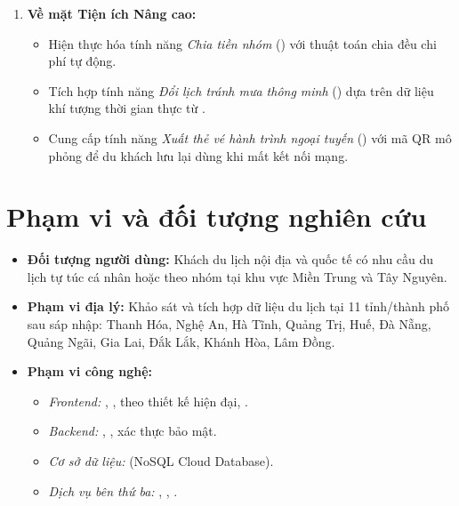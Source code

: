\begin{enumerate}
\begin{itemize}
        \item Phát triển 5 Tab chức năng chính: Khám phá (), Lên lịch (), Chuyến đi (), Trợ lý AI (), và Tài khoản ().
    \end{itemize}
    \item \textbf{Về mặt Tiện ích Nâng cao:}
    \begin{itemize}
        \item Hiện thực hóa tính năng \textit{Chia tiền nhóm} () với thuật toán chia đều chi phí tự động.
        \item Tích hợp tính năng \textit{Đổi lịch tránh mưa thông minh} () dựa trên dữ liệu khí tượng thời gian thực từ .
        \item Cung cấp tính năng \textit{Xuất thẻ vé hành trình ngoại tuyến} () với mã QR mô phỏng để du khách lưu lại dùng khi mất kết nối mạng.
    \end{itemize}
\end{enumerate}

\section{Phạm vi và đối tượng nghiên cứu}

\begin{itemize}
    \item \textbf{Đối tượng người dùng:} Khách du lịch nội địa và quốc tế có nhu cầu du lịch tự túc cá nhân hoặc theo nhóm tại khu vực Miền Trung và Tây Nguyên.
    \item \textbf{Phạm vi địa lý:} Khảo sát và tích hợp dữ liệu du lịch tại 11 tỉnh/thành phố sau sáp nhập: Thanh Hóa, Nghệ An, Hà Tĩnh, Quảng Trị, Huế, Đà Nẵng, Quảng Ngãi, Gia Lai, Đắk Lắk, Khánh Hòa, Lâm Đồng.
    \item \textbf{Phạm vi công nghệ:}
    \begin{itemize}
        \item \textit{Frontend:} , ,  theo thiết kế hiện đại, .
        \item \textit{Backend:} , ,  xác thực bảo mật.
        \item \textit{Cơ sở dữ liệu:}  (NoSQL Cloud Database).
        \item \textit{Dịch vụ bên thứ ba:} , , .
    \end{itemize}
\end{itemize}

